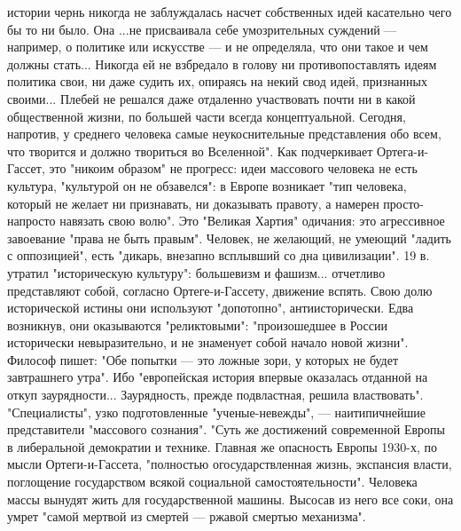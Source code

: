 \documentclass[12pt]{article}
\begin{document}
истории чернь никогда не заблуждалась насчет собственных идей касательно чего бы то ни было. Она ...не
присваивала себе умозрительных суждений — например, о политике или искусстве — и не определяла, что они
такое и чем должны стать... Никогда ей не взбредало в голову ни противопоставлять идеям политика свои, ни
даже  судить  их,  опираясь  на  некий  свод  идей,  признанных  своими...  Плебей  не  решался  даже  отдаленно
участвовать  почти  ни  в  какой  общественной  жизни,  по  большей  части  всегда  концептуальной.  Сегодня,
напротив,  у  среднего  человека  самые  неукоснительные  представления  обо  всем,  что  творится  и  должно
твориться во Вселенной". Как подчеркивает Ортега-и-Гассет, это "никоим образом" не прогресс: идеи массового
человека не есть культура, "культурой он не обзавелся": в Европе возникает "тип человека, который не желает
ни признавать, ни доказывать правоту, а намерен просто-напросто навязать свою волю". Это "Великая Хартия"
одичания: это агрессивное завоевание "права не быть правым". Человек, не желающий, не умеющий "ладить с
оппозицией", есть "дикарь, внезапно всплывший со дна цивилизации". 19 в. утратил "историческую культуру":
большевизм и фашизм... отчетливо представляют собой, согласно Ортеге-и-Гассету, движение вспять. Свою
долю исторической истины они используют "допотопно", антиисторически. Едва возникнув, они оказываются
"реликтовыми": "произошедшее в России исторически невыразительно, и не знаменует собой начало новой
жизни". Философ пишет: "Обе попытки — это ложные зори, у которых не будет завтрашнего утра". Ибо
"европейская история впервые оказалась отданной на откуп заурядности... Заурядность, прежде подвластная,
решила  властвовать".  "Специалисты",  узко  подготовленные  "ученые-невежды",  —  наитипичнейшие
представители "массового сознания". "Суть же достижений современной Европы в либеральной демократии и
технике. Главная же опасность Европы 1930-х, по мысли Ортеги-и-Гассета, "полностью огосударствленная
жизнь, экспансия власти, поглощение государством всякой социальной самостоятельности". Человека массы
вынудят жить для государственной машины. Высосав из него все соки, она умрет "самой мертвой из смертей —
ржавой смертью механизма".

\newpage
\end{document}
